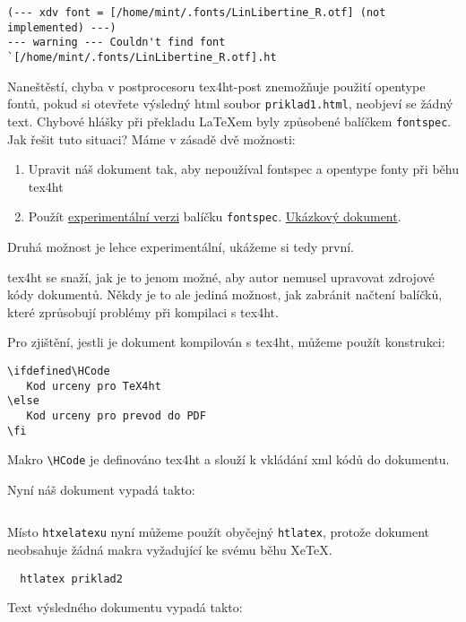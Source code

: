 \documentclass{article}
\begin{document}
\begin{verbatim}
(--- xdv font = [/home/mint/.fonts/LinLibertine_R.otf] (not implemented) ---)
--- warning --- Couldn't find font `[/home/mint/.fonts/LinLibertine_R.otf].ht
\end{verbatim}

Naneštěstí, chyba v postprocesoru \gls{tex4ht-post} znemožňuje použití opentype fontů, pokud si otevřete výsledný html soubor \verb|priklad1.html|, neobjeví se žádný text. Chybové hlášky při překladu \LaTeX em byly 
způsobené balíčkem \verb|fontspec|.  Jak řešit tuto situaci? Máme v zásadě dvě možnosti:

\begin{enumerate}
	\item Upravit náš dokument tak, aby nepoužíval fontspec a opentype fonty
		při běhu \gls{tex4ht}
	\item Použít \href{https://github.com/michal-h21/fontspec}{experimentální verzi} 
		balíčku \verb|fontspec|. 
		\href{http://michal-h21.github.io/fontspec/fontspec-4ht.html}%
		{Ukázkový dokument}.
\end{enumerate}

Druhá možnost  je lehce experimentální, ukážeme si tedy první. 

\gls{tex4ht} se snaží, jak je to jenom možné, aby autor nemusel upravovat 
zdrojové kódy dokumentů. Někdy je to ale jediná možnost, jak zabránit načtení
balíčků, které zprůsobují problémy při kompilaci s \gls{tex4ht}.

Pro zjištění, jestli je dokument kompilován s \gls{tex4ht}, můžeme použít 
konstrukci:
\begin{verbatim}
\ifdefined\HCode
   Kod urceny pro TeX4ht
\else
   Kod urceny pro prevod do PDF
\fi
\end{verbatim}

Makro \verb|\HCode| je definováno \gls{tex4ht} a slouží k vkládání \gls{xml} 
kódů do dokumentu. 

Nyní náš dokument vypadá takto:

\inputminted{latex}{priklady/priklad2.tex}

Místo \verb|htxelatexu| nyní můžeme použít obyčejný \verb|htlatex|,
protože dokument neobsahuje žádná makra vyžadující ke svému běhu Xe\TeX.

\begin{verbatim}
  htlatex priklad2
\end{verbatim}

Text výsledného dokumentu vypadá takto:
\end{document}
